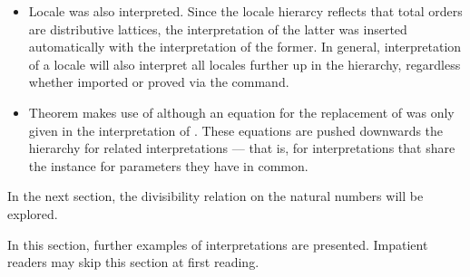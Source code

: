 \begin{isabellebody}
\begin{isamarkuptext}
\begin{itemize}
\item
  Locale  was also interpreted.  Since the
  locale hierarcy reflects that total orders are distributive
  lattices, the interpretation of the latter was inserted
  automatically with the interpretation of the former.  In general,
  interpretation of a locale will also interpret all locales further
  up in the hierarchy, regardless whether imported or proved via the
   command.
\item
  Theorem  makes use of 
  although an equation for the replacement of  was only
  given in the interpretation of .  These
  equations are pushed downwards the hierarchy for related
  interpretations --- that is, for interpretations that share the
  instance for parameters they have in common.
\end{itemize}
  In the next section, the divisibility relation on the natural
  numbers will be explored.%
\end{isamarkuptext}%
\isamarkuptrue%
%
\isamarkuptrue%
%
\begin{isamarkuptext}%
In this section, further examples of interpretations are
  presented.  Impatient readers may skip this section at first
  reading.


\end{isamarkuptext}
\end{isabellebody}
